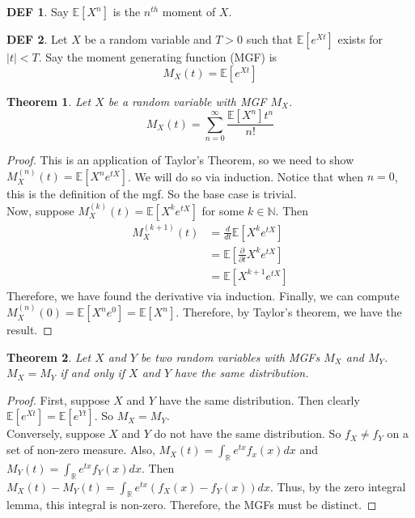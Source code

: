 \documentclass{article}
\newtheorem{theorem}{Theorem}
\theoremstyle{definition}\newtheorem{definition}{DEF}
\theoremstyle{definition}\newtheorem{example}{Ex}
\theoremstyle{lemma}\newtheorem{lemma}{Lemma}
\theoremstyle{corrolary}\newtheorem{corrolary}{Cor}
\begin{document}
\begin{definition}
Say $\mathbb{E}[X^n]$ is the $n^{th}$ moment of $X$.
\end{definition}

\begin{definition}
Let $X$ be a random variable and $T>0$ such that $\mathbb{E}[e^{Xt}]$ exists for $|t|< T$.
Say the moment generating function (MGF) is
\begin{equation}
M_X(t)=\mathbb{E}[e^{Xt}]
\end{equation}
\end{definition}

\begin{theorem}
Let $X$ be a random variable with MGF $M_X$.
\begin{equation}
M_X(t)=\sum_{n=0}^\infty \frac{\mathbb{E}[X^n]t^n}{n!}
\end{equation}
\end{theorem}
\begin{proof}
This is an application of Taylor's Theorem, so we need to show $M_X^{(n)}(t)=\mathbb{E}[X^ne^{tX}]$.
We will do so via induction.
Notice that when $n=0$, this is the definition of the mgf.
So the base case is trivial. \\
Now, suppose $M_X^{(k)}(t) = \mathbb{E}[X^ke^{tX}]$ for some $k\in \mathbb{N}$.
Then
\begin{align*}
M_X^{(k+1)}(t) &= \frac{d}{dt}\mathbb{E}[X^k e^{tX}]\\
&= \mathbb{E}[\frac{\partial}{\partial t}X^ke^{tX}]\\
&= \mathbb{E}[X^{k+1}e^{tX}]
\end{align*}
Therefore, we have found the derivative via induction.
Finally, we can compute $M_X^{(n)}(0)=\mathbb{E}[X^ne^0]=\mathbb{E}[X^n]$.
Therefore, by Taylor's theorem, we have the result.
\end{proof}

\begin{theorem}
Let $X$ and $Y$ be two random variables with MGFs $M_X$ and $M_Y$.
$M_X = M_Y$ if and only if $X$ and $Y$ have the same distribution.
\end{theorem}
\begin{proof}
First, suppose $X$ and $Y$ have the same distribution.
Then clearly $\mathbb{E}[e^{Xt}]=\mathbb{E}[e^{Yt}]$.
So $M_X=M_Y$.\\
Conversely, suppose $X$ and $Y$ do not have the same distribution.
So $f_X \neq f_Y$ on a set of non-zero measure.
Also, $M_X(t)=\int_\mathbb{R} e^{tx}f_x(x)dx$ and $M_Y(t)=\int_\mathbb{R} e^{tx}f_Y(x)dx$.
Then $M_X(t)-M_Y(t)=\int_\mathbb{R} e^{tx}(f_X(x)-f_Y(x))dx$.
Thus, by the zero integral lemma, this integral is non-zero.
Therefore, the MGFs must be distinct.
\end{proof}
\end{document}
